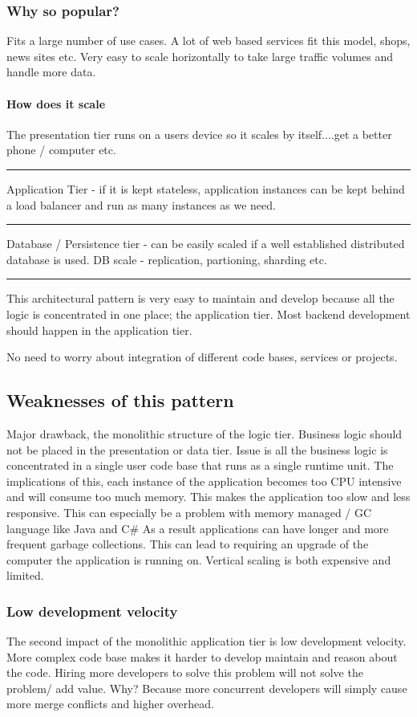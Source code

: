 \subsubsection{Why so popular?}
Fits a large number of use cases.
A lot of web based services fit this model, shops, news sites etc.
Very easy to scale horizontally to take large traffic volumes and handle more data.

\paragraph{How does it scale}
The presentation tier runs on a users device so it scales by itself....get a better phone / computer etc.
\hrule
Application Tier - if it is kept stateless, application instances can be kept behind a load balancer and run as many instances as we need.
\hrule
Database / Persistence tier - can be easily scaled if a well established distributed database is used. DB scale - replication, partioning, sharding etc.

\hrule
This architectural pattern is very easy to maintain and develop because all the logic is concentrated in one place; the application tier.
Most backend development should happen in the application tier.

No need to worry about integration of different code bases, services or projects.

\subsection{Weaknesses of this pattern}

Major drawback, the monolithic structure of the logic tier.
Business logic should not be placed in the presentation or data tier.
Issue is all the business logic is concentrated in a single user code base that runs as a single runtime unit.
The implications of this, each instance of the application becomes too CPU intensive and will consume too much memory.
This makes the application too slow and less responsive.
This can especially be a problem with memory managed / GC language like Java and C\#
As a result applications can have longer and more frequent garbage collections.
This can lead to requiring an upgrade of the computer the application is running on.
Vertical scaling is both expensive and limited.

\subsubsection{Low development velocity}
The second impact of the monolithic application tier is low development velocity.
More complex code base makes it harder to develop maintain and reason about the code.
Hiring more developers to solve this problem will not solve the problem/ add value.
Why?
Because more concurrent developers will simply cause more merge conflicts and higher overhead.

